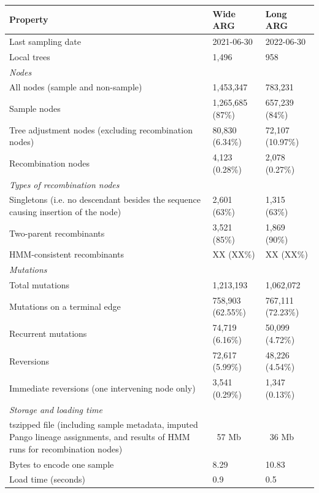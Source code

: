 \documentclass{article}
\begin{document}
\begin{table} \centering \begin{tabular}{l|l|l} \hline \textbf{Property} &
\textbf{Wide ARG} & \textbf{Long ARG} \\ \hline Last sampling date & 2021-06-30
& 2022-06-30 \\ Local trees & 1,496 & 958 \\ \hline
\multicolumn{3}{l}{\textit{Nodes}} \\ All nodes (sample and non-sample) &
1,453,347 & 783,231 \\ Sample nodes & 1,265,685 (87\%) & 657,239 (84\%) \\ Tree
adjustment nodes (excluding recombination nodes) & 80,830 (6.34\%) & 72,107
(10.97\%) \\ Recombination nodes & 4,123 (0.28\%) & 2,078 (0.27\%) \\ \hline
\multicolumn{3}{l}{\textit{Types of recombination nodes}} \\ Singletons (i.e.
no descendant besides the sequence causing insertion of the node) & 2,601
(63\%) & 1,315 (63\%) \\ Two-parent recombinants & 3,521 (85\%) & 1,869 (90\%)
\\ HMM-consistent recombinants & XX (XX\%) & XX (XX\%) \\ \hline
\multicolumn{3}{l}{\textit{Mutations}} \\ Total mutations & 1,213,193 &
1,062,072 \\ Mutations on a terminal edge & 758,903 (62.55\%) & 767,111
(72.23\%) \\ Recurrent mutations & 74,719 (6.16\%) & 50,099 (4.72\%) \\
Reversions & 72,617 (5.99\%) & 48,226 (4.54\%) \\ Immediate reversions (one
intervening node only) & 3,541 (0.29\%) & 1,347 (0.13\%) \\ \hline
\multicolumn{3}{l}{\textit{Storage and loading time}} \\ tszipped file
(including sample metadata, imputed Pango lineage assignments, and results of
HMM runs for recombination nodes) & ~57 Mb & ~36 Mb \\ Bytes to encode one
sample & 8.29 & 10.83 \\ Load time (seconds) & 0.9 & 0.5 \\ \hline
\end{tabular} \end{table}
\end{document}

